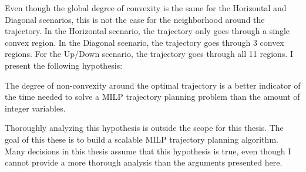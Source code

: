 Even though the global degree of convexity is the same for the Horizontal and Diagonal scenarios, this is not the case for the neighborhood around the trajectory. In the Horizontal scenario, the trajectory only goes through a single convex region. In the Diagonal scenario, the trajectory goes through 3 convex regions. For the Up/Down scenario, the trajectory goes through all 11 regions. I present the following hypothesis:
\begin{hyp}
The degree of non-convexity around the optimal trajectory is a better indicator of the time needed to solve a MILP trajectory planning problem than the amount of integer variables.
\label{hyp:nonconvex}
\end{hyp}

Thoroughly analyzing this hypothesis is outside the scope for this thesis. The goal of this these is to build a scalable MILP trajectory planning algorithm. Many decisions in this thesis assume that this hypothesis is true, even though I cannot provide a more thorough analysis than the arguments presented here.

%
%
%
%

%
%


